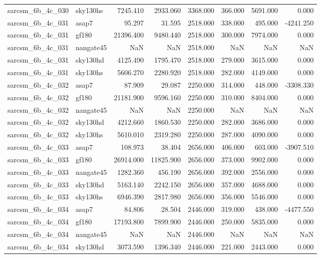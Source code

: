\begin{tabular}{llrrrrrr}
sarcsm\_6b\_4c\_030 & sky130hs & 7245.410 & 2933.060 & 3368.000 & 366.000 & 5691.000 & 0.000 \\
sarcsm\_6b\_4c\_031 & asap7 & 95.297 & 31.595 & 2518.000 & 338.000 & 495.000 & -4241.250 \\
sarcsm\_6b\_4c\_031 & gf180 & 21396.400 & 9480.440 & 2518.000 & 300.000 & 7974.000 & 0.000 \\
sarcsm\_6b\_4c\_031 & nangate45 & NaN & NaN & 2518.000 & NaN & NaN & NaN \\
sarcsm\_6b\_4c\_031 & sky130hd & 4125.490 & 1795.470 & 2518.000 & 279.000 & 3615.000 & 0.000 \\
sarcsm\_6b\_4c\_031 & sky130hs & 5606.270 & 2280.920 & 2518.000 & 282.000 & 4149.000 & 0.000 \\
sarcsm\_6b\_4c\_032 & asap7 & 87.909 & 29.087 & 2250.000 & 314.000 & 448.000 & -3308.330 \\
sarcsm\_6b\_4c\_032 & gf180 & 21181.900 & 9596.160 & 2250.000 & 310.000 & 8404.000 & 0.000 \\
sarcsm\_6b\_4c\_032 & nangate45 & NaN & NaN & 2250.000 & NaN & NaN & NaN \\
sarcsm\_6b\_4c\_032 & sky130hd & 4212.660 & 1860.530 & 2250.000 & 282.000 & 3686.000 & 0.000 \\
sarcsm\_6b\_4c\_032 & sky130hs & 5610.010 & 2319.280 & 2250.000 & 287.000 & 4090.000 & 0.000 \\
sarcsm\_6b\_4c\_033 & asap7 & 108.973 & 38.404 & 2656.000 & 406.000 & 603.000 & -3907.510 \\
sarcsm\_6b\_4c\_033 & gf180 & 26914.000 & 11825.900 & 2656.000 & 373.000 & 9902.000 & 0.000 \\
sarcsm\_6b\_4c\_033 & nangate45 & 1282.360 & 456.190 & 2656.000 & 392.000 & 2556.000 & 0.000 \\
sarcsm\_6b\_4c\_033 & sky130hd & 5163.140 & 2242.150 & 2656.000 & 357.000 & 4688.000 & 0.000 \\
sarcsm\_6b\_4c\_033 & sky130hs & 6946.390 & 2817.980 & 2656.000 & 356.000 & 5546.000 & 0.000 \\
sarcsm\_6b\_4c\_034 & asap7 & 84.806 & 28.504 & 2446.000 & 319.000 & 438.000 & -4477.550 \\
sarcsm\_6b\_4c\_034 & gf180 & 17193.800 & 7899.900 & 2446.000 & 250.000 & 5835.000 & 0.000 \\
sarcsm\_6b\_4c\_034 & nangate45 & NaN & NaN & 2446.000 & NaN & NaN & NaN \\
sarcsm\_6b\_4c\_034 & sky130hd & 3073.590 & 1396.340 & 2446.000 & 221.000 & 2443.000 & 0.000 \\

\end{tabular}
